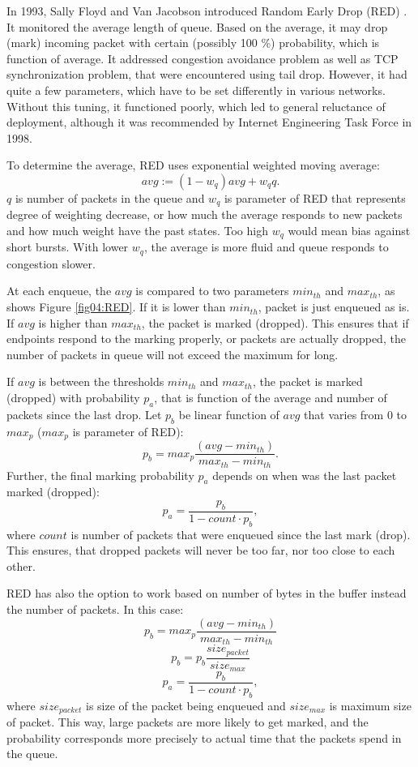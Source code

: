 
In 1993, Sally Floyd and Van Jacobson introduced Random Early Drop (RED) \cite{Floyd:1993:RED:169931.169935}. It monitored the average length of queue. Based on the average, it may drop (mark) incoming packet with certain (possibly 100 \%) probability, which is function of average. It addressed congestion avoidance problem as well as TCP synchronization problem, that were encountered using tail drop. However, it had quite a few parameters, which have to be set differently in various networks. Without this tuning, it functioned poorly, which led to general reluctance of deployment, although it was recommended by Internet Engineering Task Force \cite{rfc2309} in 1998.

To determine the average, RED uses exponential weighted moving average:
\[
avg := (1 - w_q)avg+w_qq.
\]
$q$ is number of packets in the queue and $w_q$ is parameter of RED that represents degree of weighting decrease, or how much the average responds to new packets and how much weight have the past states. Too high $w_q$ would mean bias against short bursts. With lower $w_q$, the average is more fluid and queue responds to congestion slower.

At each enqueue, the $avg$ is compared to two parameters $min_{th}$ and $max_{th}$, as shows Figure \ref{fig04:RED}. If it is lower than $min_{th}$, packet is just enqueued as is. If $avg$ is higher than $max_{th}$, the packet is marked (dropped). This ensures that if endpoints respond to the marking properly, or packets are actually dropped, the number of packets in queue will not exceed the maximum for long.

If $avg$ is between the thresholds $min_{th}$ and $max_{th}$, the packet is marked (dropped) with probability $p_a$, that is function of the average and number of packets since the last drop. Let $p_b$ be linear function of $avg$ that varies from 0 to $max_p$ ($max_p$ is parameter of RED):
\[
  p_b = max_p \frac{(avg - min_{th})}{max_{th} - min_{th}}.
\]
Further, the final marking probability $p_a$ depends on when was the last packet marked (dropped):
\[
p_a = \frac{p_b}{1-count \cdot p_b},
\]
where $count$ is number of packets that were enqueued since the last mark (drop). This ensures, that dropped packets will never be too far, nor too close to each other\cite[Section 7]{Floyd:1993:RED:169931.169935}.

RED has also the option to work based on number of bytes in the buffer instead the number of packets. In this case:
\[
  p_b = max_p \frac{(avg - min_{th})}{max_{th} - min_{th}}
\]\[
  p_b = p_b \frac{size_{packet}}{size_{max}}
\]\[
  p_a = \frac{p_b}{1-count \cdot p_b},
\]
where $size_{packet}$ is size of the packet being enqueued and $size_{max}$ is maximum size of packet. This way, large packets are more likely to get marked, and the probability corresponds more precisely to actual time that the packets spend in the queue.

